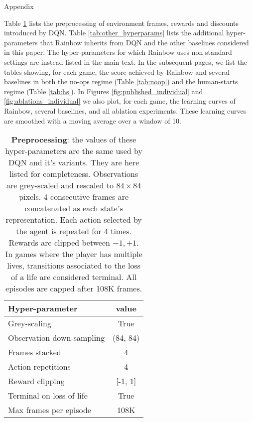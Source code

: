 \documentclass[letterpaper]{article} %
\begin{document}




\onecolumn
\begin{center}
{\Huge{Appendix}}\\
\end{center}
\vspace{1.5cm}
Table \ref{tab:preprocess} lists the preprocessing of environment frames, rewards and discounts introduced by DQN. Table \ref{tab:other_hyperparams} lists the additional hyper-parameters that Rainbow inherits from DQN and the other baselines considered in this paper. The hyper-parameters for which Rainbow uses non standard settings are instead listed in the main text. In the subsequent pages, we list the tables showing, for each game, the score achieved by Rainbow and several baselines in both the no-ops regime (Table \ref{tab:noop}) and the human-starts regime (Table \ref{tab:hs}). In Figures \ref{fig:published_individual} and \ref{fig:ablations_individual} we also plot, for each game, the learning curves of Rainbow, several baselines, and all ablation experiments. These learning curves are smoothed with a moving average over a window of 10.

\vspace{6em}

\begin{table}[h!]
\centering
\begin{tabular}{ l | c }
\hline
Hyper-parameter           & value \\
\hline
 Grey-scaling           & True \\
 Observation down-sampling      & (84, 84) \\ 
 Frames stacked         &  4 \\
 Action repetitions        &  4 \\
 Reward clipping        & [-1, 1] \\
 Terminal on loss of life & True \\
 Max frames per episode & 108K \\
\hline

\end{tabular}
\caption{\textbf{Preprocessing}: the values of these hyper-parameters are the same used by DQN and it’s variants. They are here listed for completeness. Observations are grey-scaled and rescaled to $84\times84$ pixels. 4 consecutive frames are concatenated as each state's representation. Each action selected by the agent is repeated for 4 times. Rewards are clipped between $-1, +1$. In games where the player has multiple lives, transitions associated to the loss of a life are considered terminal. All episodes are capped after 108K frames.
}
\label{tab:preprocess}
\end{table}
\end{document}
